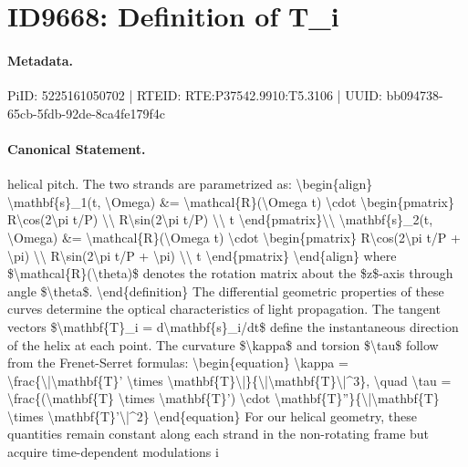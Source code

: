 \section*{ID9668: Definition of T\_i}
\paragraph{Metadata.}
PiID: 5225161050702 | RTEID: RTE:P37542.9910:T5.3106 | UUID: bb094738-65cb-5fdb-92de-8ca4fe179f4c

\paragraph{Canonical Statement.}
helical pitch. The two strands are parametrized as: \textbackslash{}begin\{align\} \textbackslash{}mathbf\{s\}\_1(t, \textbackslash{}Omega) \&= \textbackslash{}mathcal\{R\}(\textbackslash{}Omega t) \textbackslash{}cdot \textbackslash{}begin\{pmatrix\} R\textbackslash{}cos(2\textbackslash{}pi t/P) \textbackslash{}\textbackslash{} R\textbackslash{}sin(2\textbackslash{}pi t/P) \textbackslash{}\textbackslash{} t \textbackslash{}end\{pmatrix\}\textbackslash{}\textbackslash{} \textbackslash{}mathbf\{s\}\_2(t, \textbackslash{}Omega) \&= \textbackslash{}mathcal\{R\}(\textbackslash{}Omega t) \textbackslash{}cdot \textbackslash{}begin\{pmatrix\} R\textbackslash{}cos(2\textbackslash{}pi t/P + \textbackslash{}pi) \textbackslash{}\textbackslash{} R\textbackslash{}sin(2\textbackslash{}pi t/P + \textbackslash{}pi) \textbackslash{}\textbackslash{} t \textbackslash{}end\{pmatrix\} \textbackslash{}end\{align\} where \$\textbackslash{}mathcal\{R\}(\textbackslash{}theta)\$ denotes the rotation matrix about the \$z\$-axis through angle \$\textbackslash{}theta\$. \textbackslash{}end\{definition\} The differential geometric properties of these curves determine the optical characteristics of light propagation. The tangent vectors \$\textbackslash{}mathbf\{T\}\_i = d\textbackslash{}mathbf\{s\}\_i/dt\$ define the instantaneous direction of the helix at each point. The curvature \$\textbackslash{}kappa\$ and torsion \$\textbackslash{}tau\$ follow from the Frenet-Serret formulas: \textbackslash{}begin\{equation\} \textbackslash{}kappa = \textbackslash{}frac\{\textbackslash{}|\textbackslash{}mathbf\{T\}' \textbackslash{}times \textbackslash{}mathbf\{T\}\textbackslash{}|\}\{\textbackslash{}|\textbackslash{}mathbf\{T\}\textbackslash{}|\textasciicircum{}3\}, \textbackslash{}quad \textbackslash{}tau = \textbackslash{}frac\{(\textbackslash{}mathbf\{T\} \textbackslash{}times \textbackslash{}mathbf\{T\}') \textbackslash{}cdot \textbackslash{}mathbf\{T\}''\}\{\textbackslash{}|\textbackslash{}mathbf\{T\} \textbackslash{}times \textbackslash{}mathbf\{T\}'\textbackslash{}|\textasciicircum{}2\} \textbackslash{}end\{equation\} For our helical geometry, these quantities remain constant along each strand in the non-rotating frame but acquire time-dependent modulations i

